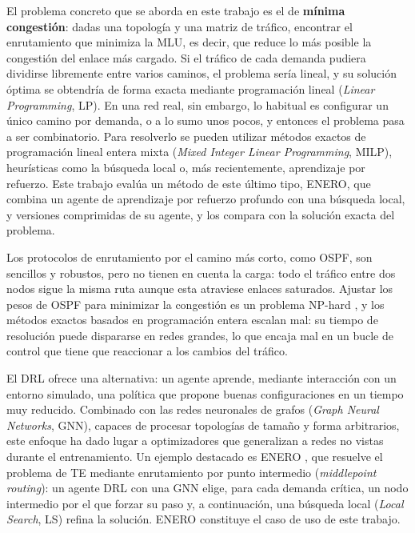 El problema concreto que se aborda en este trabajo es el de \textbf{mínima congestión}: dadas una topología y una matriz de tráfico, encontrar el enrutamiento que minimiza la MLU, es decir, que reduce lo más posible la congestión del enlace más cargado. Si el tráfico de cada demanda pudiera dividirse libremente entre varios caminos, el problema sería lineal, y su solución óptima se obtendría de forma exacta mediante programación lineal (\textit{Linear Programming}, LP). En una red real, sin embargo, lo habitual es configurar un único camino por demanda, o a lo sumo unos pocos, y entonces el problema pasa a ser combinatorio. Para resolverlo se pueden utilizar métodos exactos de programación lineal entera mixta (\textit{Mixed Integer Linear Programming}, MILP), heurísticas como la búsqueda local o, más recientemente, aprendizaje por refuerzo. Este trabajo evalúa un método de este último tipo, ENERO, que combina un agente de aprendizaje por refuerzo profundo con una búsqueda local, y versiones comprimidas de su agente, y los compara con la solución exacta del problema.

Los protocolos de enrutamiento por el camino más corto, como OSPF, son sencillos y robustos, pero no tienen en cuenta la carga: todo el tráfico entre dos nodos sigue la misma ruta aunque esta atraviese enlaces saturados. Ajustar los pesos de OSPF para minimizar la congestión es un problema NP-hard \cite{fortz2000internet}, y los métodos exactos basados en programación entera escalan mal: su tiempo de resolución puede dispararse en redes grandes, lo que encaja mal en un bucle de control que tiene que reaccionar a los cambios del tráfico.

El DRL ofrece una alternativa: un agente aprende, mediante interacción con un entorno simulado, una política que propone buenas configuraciones en un tiempo muy reducido. Combinado con las redes neuronales de grafos (\textit{Graph Neural Networks}, GNN), capaces de procesar topologías de tamaño y forma arbitrarios, este enfoque ha dado lugar a optimizadores que generalizan a redes no vistas durante el entrenamiento. Un ejemplo destacado es ENERO \cite{ALMASAN2022109166}, que resuelve el problema de TE mediante enrutamiento por punto intermedio (\textit{middlepoint routing}): un agente DRL con una GNN elige, para cada demanda crítica, un nodo intermedio por el que forzar su paso y, a continuación, una búsqueda local (\textit{Local Search}, LS) refina la solución. ENERO constituye el caso de uso de este trabajo.


